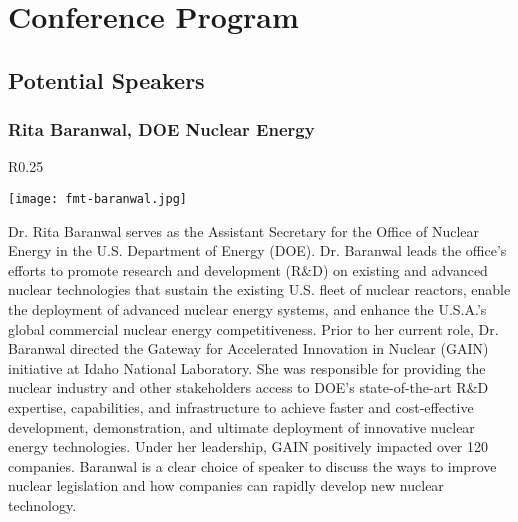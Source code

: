 \section{Conference Program}

\subsection{Potential Speakers}

\subsubsection{Rita Baranwal, DOE Nuclear Energy}
\setlength\intextsep{0pt}
\begin{wrapfigure}{R}{0.25\textwidth}
	\begin{center}
		\texttt{[image: fmt-baranwal.jpg]}
	\end{center}
\end{wrapfigure}
Dr. Rita Baranwal serves as the Assistant Secretary for the Office of Nuclear Energy in the U.S. Department of Energy (DOE).  Dr. Baranwal leads the office’s efforts to promote research and development (R$\&$D) on existing and advanced nuclear technologies that sustain the existing U.S. fleet of nuclear reactors, enable the deployment of advanced nuclear energy systems, and enhance the U.S.A.'s global commercial nuclear energy competitiveness. Prior to her current role, Dr. Baranwal directed the Gateway for Accelerated Innovation in Nuclear (GAIN) initiative at Idaho National Laboratory.  She was responsible for providing the nuclear industry and other stakeholders access to DOE's state-of-the-art R$\&$D expertise, capabilities, and infrastructure to achieve faster and cost-effective development, demonstration, and ultimate deployment of innovative nuclear energy technologies. Under her leadership, GAIN positively impacted over 120 companies. Baranwal is a clear choice of speaker to discuss the ways to improve nuclear legislation and how companies can rapidly develop new nuclear technology.\\

\clearpage
